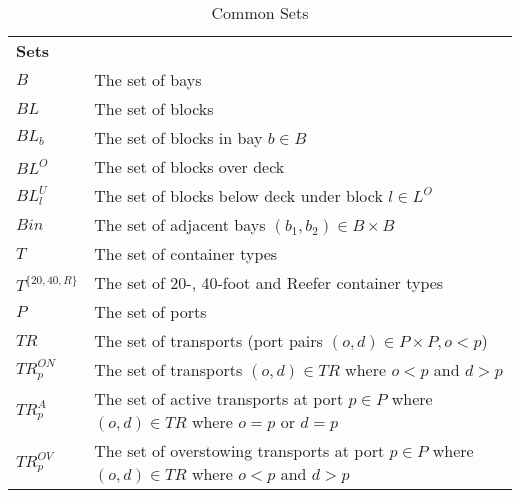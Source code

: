 \documentclass[preprint,12pt,authoryear]{elsarticle}
\begin{document}
\begin{table}[h]
    \centering
    \begin{tabularx}{\textwidth}{lX}
        \multicolumn{2}{l}{{\bf Sets}}\\
        $B$& The set of bays  \\
        $BL$ & The set of blocks \\
        $BL_b$ & The set of blocks in bay $b\in B$\\
        $BL^O$ & The set of blocks over deck\\
        $BL^U_l$ & The set of blocks below deck under block $l\in L^O$\\
        $Bin$ & The set of adjacent bays $(b_1,b_2) \in B\times B$\\
        $T$ & The set of container types\\
        $T^{\{20,40,R\}}$ & The set of 20-, 40-foot and Reefer container types\\ 
        $P$ & The set of ports\\
        $TR$ & The set of transports (port pairs $(o,d) \in P\times P,o<p$)\\
        $TR^{ON}_p$ & The set of transports $(o,d) \in TR$ where $o<p$ and $d>p$\\
        $TR^{A}_p$ & The set of active transports at port $p\in P$ where $(o,d) \in TR$ where $o=p$ or $d=p$\\
        $TR^{OV}_p$ & The set of overstowing transports at port $p\in P$ where $(o,d) \in TR$ where $o<p$ and $d>p$\\
    \end{tabularx}
    \caption{Common Sets}
    \label{tab:generalNotationSets}
\end{table}
\end{document}
